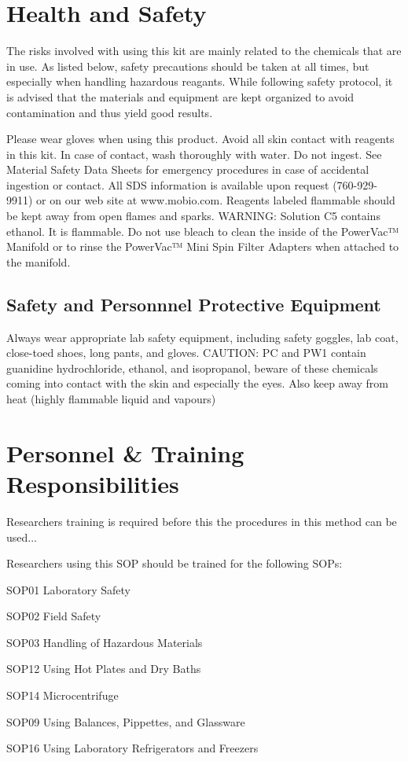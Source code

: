 \documentclass[12pt]{../SOP3_alpha}
\begin{document}
\section{Health and Safety}

\NP The risks involved with using this kit are mainly related to the chemicals that are in use. As listed below, safety precautions should be taken at all times, but especially when handling hazardous reagants. While following safety protocol, it is advised that the materials and equipment are kept organized to avoid contamination and thus yield good results. 

Please wear gloves when using this product. Avoid all skin contact with
reagents in this kit. In case of contact, wash thoroughly with water. Do not
ingest. See Material Safety Data Sheets for emergency procedures in case
of accidental ingestion or contact. All SDS information is available upon
request (760-929-9911) or on our web site at www.mobio.com. Reagents
labeled flammable should be kept away from open flames and sparks.
WARNING: Solution C5 contains ethanol. It is flammable. Do not use bleach to
clean the inside of the PowerVac™ Manifold or to rinse the PowerVac™ Mini Spin
Filter Adapters when attached to the manifold.

\subsection {Safety and Personnnel Protective Equipment}

Always wear appropriate lab safety equipment, including safety goggles, lab coat, close-toed shoes, long pants, and gloves. 
CAUTION: PC and PW1 contain guanidine hydrochloride, ethanol, and isopropanol, beware of these chemicals coming into contact with the skin and especially the eyes. Also keep away from heat (highly flammable liquid and vapours)


\section{Personnel \& Training Responsibilities}

\NP Researchers training is required before this the procedures in this method can be used... 

\NP Researchers using this SOP should be trained for the following SOPs:

\begin{itemize*}
  \item SOP01 Laboratory Safety
  \item SOP02 Field Safety
  \item SOP03 Handling of Hazardous Materials
  \item SOP12 Using Hot Plates and Dry Baths
  \item SOP14 Microcentrifuge
  \item SOP09 Using Balances, Pippettes, and Glassware
  \item SOP16 Using Laboratory Refrigerators and Freezers
\end{itemize*}
\end{document}

